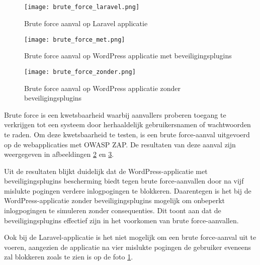 \subsection{}
\begin{figure}
    \centering
    \texttt{[image: brute\_force\_laravel.png]}
    \caption[Brute force aanval op Laravel applicatie]{Brute force aanval op Laravel applicatie}
    \label{fig:brute_force_laravel}
\end{figure}
\begin{figure}
    \centering
    \texttt{[image: brute\_force\_met.png]}
    \caption[Brute force aanval op WordPress applicatie met beveiligingsplugins]{Brute force aanval op WordPress applicatie met beveiligingsplugins}
    \label{fig:brute_force_met}
\end{figure}
\begin{figure}
    \centering
    \texttt{[image: brute\_force\_zonder.png]}
    \caption[Brute force aanval op WordPress applicatie zonder beveiligingsplugins]{Brute force aanval op WordPress applicatie zonder beveiligingsplugins}
    \label{fig:brute_force_zonder}
\end{figure}

Brute force is een kwetsbaarheid waarbij aanvallers proberen toegang te verkrijgen tot een systeem door herhaaldelijk gebruikersnamen 
of wachtwoorden te raden. Om deze kwetsbaarheid te testen, is een brute force-aanval uitgevoerd op de webapplicaties met OWASP ZAP. De 
resultaten van deze aanval zijn weergegeven in afbeeldingen \ref{fig:brute_force_met} en \ref{fig:brute_force_zonder}. 

Uit de resultaten blijkt duidelijk dat de WordPress-applicatie met beveiligingsplugins bescherming biedt tegen brute 
force-aanvallen door na vijf mislukte pogingen verdere inlogpogingen te blokkeren. Daarentegen is het bij de 
WordPress-applicatie zonder beveiligingsplugins mogelijk om onbeperkt inlogpogingen te simuleren zonder consequenties. Dit toont 
aan dat de beveiligingsplugins effectief zijn in het voorkomen van brute force-aanvallen.

Ook bij de Laravel-applicatie is het niet mogelijk om een brute force-aanval uit te voeren, aangezien de applicatie na vier 
mislukte pogingen de gebruiker eveneens zal blokkeren zoals te zien is op de foto \ref{fig:brute_force_laravel}.
